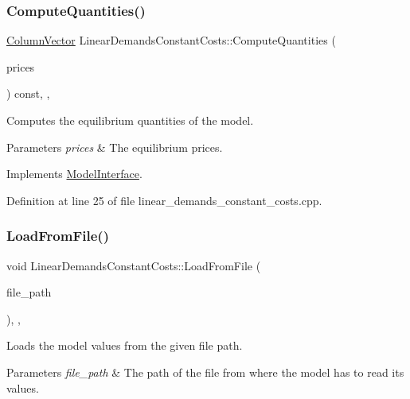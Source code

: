 \subsubsection{\texorpdfstring{Compute\+Quantities()}{ComputeQuantities()}}
{\footnotesize\ttfamily \hyperlink{classColumnVector}{Column\+Vector} Linear\+Demands\+Constant\+Costs\+::\+Compute\+Quantities (\begin{DoxyParamCaption}\item[{\hyperlink{classColumnVector}{Column\+Vector} const \&}]{prices }\end{DoxyParamCaption}) const\hspace{0.3cm}{\ttfamily [final]}, {\ttfamily [override]}, {\ttfamily [virtual]}}

Computes the equilibrium quantities of the model.


\begin{DoxyParams}{Parameters}
{\em prices} & The equilibrium prices. \\
\hline
\end{DoxyParams}


Implements \hyperlink{classModelInterface_af9a936f6f0d1b1f0f2c5bf35785e7db4}{Model\+Interface}.



Definition at line 25 of file linear\+\_\+demands\+\_\+constant\+\_\+costs.\+cpp.

\mbox{\label{classLinearDemandsConstantCosts_a075add461e368629b9dfd8f72033e2ad}} 
\subsubsection{\texorpdfstring{Load\+From\+File()}{LoadFromFile()}}
{\footnotesize\ttfamily void Linear\+Demands\+Constant\+Costs\+::\+Load\+From\+File (\begin{DoxyParamCaption}\item[{std\+::string const \&}]{file\+\_\+path }\end{DoxyParamCaption})\hspace{0.3cm}{\ttfamily [final]}, {\ttfamily [override]}, {\ttfamily [virtual]}}

Loads the model values from the given file path.


\begin{DoxyParams}{Parameters}
{\em file\+\_\+path} & The path of the file from where the model has to read its values. \\
\hline
\end{DoxyParams}


